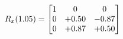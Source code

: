 \documentclass[preview]{standalone}
\begin{document}
\begin{align*}
\special{dvisvgm:raw <g id='unique000'>}R_{x}(1.05) = \begin{bmatrix}1 & 0 & 0 \\0 & +0.50 & -0.87 \\0 & +0.87 & +0.50\end{bmatrix}\special{dvisvgm:raw </g>}
\end{align*}
\end{document}
